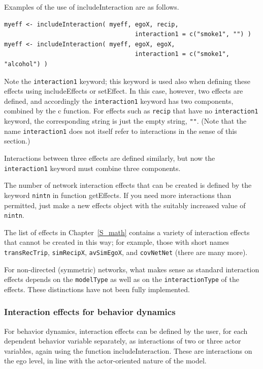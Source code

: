 \documentclass[a4paper,fleqn,11pt]{article}
\newcommand{\+}{\, + \,}
\newcommand{\sfn}[1]{\textsf{#1}}
\begin{document}
Examples of the use of \sfn{includeInteraction} are as follows.
\begin{verbatim}
myeff <- includeInteraction( myeff, egoX, recip,
                                    interaction1 = c("smoke1", "") )
myeff <- includeInteraction( myeff, egoX, egoX,
                                    interaction1 = c("smoke1", "alcohol") )
\end{verbatim}
Note the \texttt{interaction1} keyword; this keyword is used also
when defining these effects using \sfn{includeEffects} or
\textsf{setEffect}. In this case, however, two effects are defined,
and accordingly the \texttt{interaction1} keyword has two components,
combined by the \sfn{c} function.
For effects such as \texttt{recip} that have no \texttt{interaction1}
keyword, the corresponding string is just the empty string, \texttt{""}.
(Note that the name \texttt{interaction1} does not itself refer to interactions
in the sense of this section.)

Interactions between three effects are defined similarly,
but now the \texttt{interaction1} keyword must combine three components.

The number of network interaction effects that can be created is defined by the
keyword \texttt{nintn} in function \sfn{getEffects}. If you need more
interactions than permitted, just make a new effects object with the
suitably increased value of \texttt{nintn}.

The list of effects in Chapter~\ref{S_math} contains a variety of
interaction effects that cannot be created in this way;
for example, those with short names
\texttt{transRecTrip}, \texttt{simRecipX},  \texttt{avSimEgoX},
and \texttt{covNetNet} (there are many more).
\medskip

For non-directed (symmetric) networks, what makes sense as standard interaction
effects depends on the \texttt{modelType} as well as on the
 \texttt{interactionType} of the effects. These distinctions have not been fully
implemented.

\subsubsection{Interaction effects for behavior dynamics}
\label{S_beh_infl}

For behavior dynamics, interaction effects can be defined
by the user, for each dependent behavior variable separately,
as interactions of two or three actor variables,
again using the function \textsf{includeInteraction}.
These are interactions on the ego level, in line with the
actor-oriented nature of the model.
\end{document}
